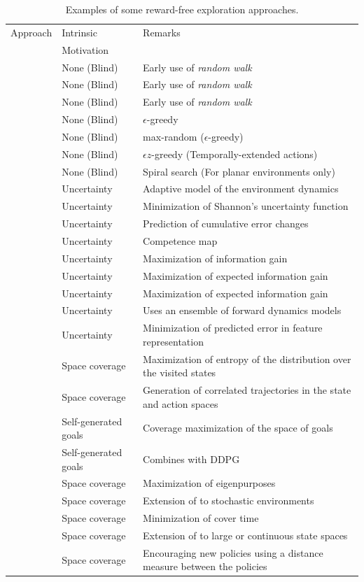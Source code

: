 \begin{table}
    \centering
    \begin{tabular}{p{4.9cm}|p{2.5cm} |p{7cm}}
        Approach & Intrinsic  & Remarks \\
         & Motivation & \\
        \hline
        & None (Blind) & Early use of \emph{random walk}
        \\
        & None (Blind) & Early use of \emph{random walk}
        \\
	& None (Blind) & Early use of \emph{random walk}
	\\
	& None (Blind) & $\epsilon$-greedy
	\\
	& None (Blind) & max-random ($\epsilon$-greedy)
	\\
	& None (Blind) & $\epsilon z$-greedy (Temporally-extended actions)
	\\
	& None (Blind) & Spiral search (For planar environments only)
	\\
	& Uncertainty & Adaptive model of the environment dynamics
	\\
	& Uncertainty & Minimization of Shannon's uncertainty function
	\\
	& Uncertainty & Prediction of cumulative error changes
	\\
	& Uncertainty & Competence map
	\\
	& Uncertainty & Maximization of information gain
	\\
	& Uncertainty & Maximization of expected information gain
	\\
	& Uncertainty & Maximization of expected information gain
	\\
	& Uncertainty & Uses an ensemble of forward dynamics models
	\\
	& Uncertainty & Minimization of predicted error in feature representation
	\\
	& Space coverage & Maximization of entropy of the distribution over the visited states
	\\
	& Space coverage & Generation of correlated trajectories in the state and action spaces
	\\
	& Self-generated goals & Coverage maximization of the space of goals
	\\
	& Self-generated goals & Combines  with DDPG
	\\
	& Space coverage & Maximization of eigenpurposes
	\\
	& Space coverage & Extension of  to stochastic environments
	\\
	& Space coverage & Minimization of cover time
	\\
	& Space coverage & Extension of  to large or continuous state spaces
	\\
	& Space coverage & Encouraging new policies using a distance measure between the policies
    \end{tabular}
    \caption{Examples of some reward-free exploration approaches.}
    \label{tab:reward-free}
\end{table}
